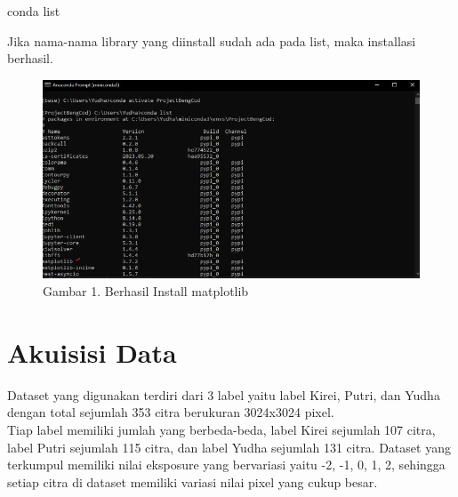 \documentclass[
  letterpaper,
  DIV=11,
  numbers=noendperiod]{scrreprt}
\newenvironment{Shaded}{\begin{snugshade}}{\end{snugshade}}
\newcommand{\NormalTok}[1]{\textcolor[rgb]{0.00,0.23,0.31}{#1}}
\begin{document}
\begin{enumerate}
\begin{itemize}
\begin{Shaded}
\begin{Highlighting}[]
\NormalTok{conda list}
\end{Highlighting}
\end{Shaded}

    Jika nama-nama library yang diinstall sudah ada pada list, maka
    installasi berhasil.\\

    \begin{figure}

    {\centering \includegraphics{Asset/condalist.jpg}

    }

    \caption{Gambar 1. Berhasil Install matplotlib}

    \end{figure}
  \end{itemize}
\end{enumerate}

\hypertarget{akuisisi-data}{%
\section*{Akuisisi Data}\label{akuisisi-data}}


Dataset yang digunakan terdiri dari 3 label yaitu label Kirei, Putri,
dan Yudha dengan total sejumlah 353 citra berukuran 3024x3024 pixel.\\
Tiap label memiliki jumlah yang berbeda-beda, label Kirei sejumlah 107
citra, label Putri sejumlah 115 citra, dan label Yudha sejumlah 131
citra. Dataset yang terkumpul memiliki nilai eksposure yang bervariasi
yaitu -2, -1, 0, 1, 2, sehingga setiap citra di dataset memiliki variasi
nilai pixel yang cukup besar.
\end{document}
